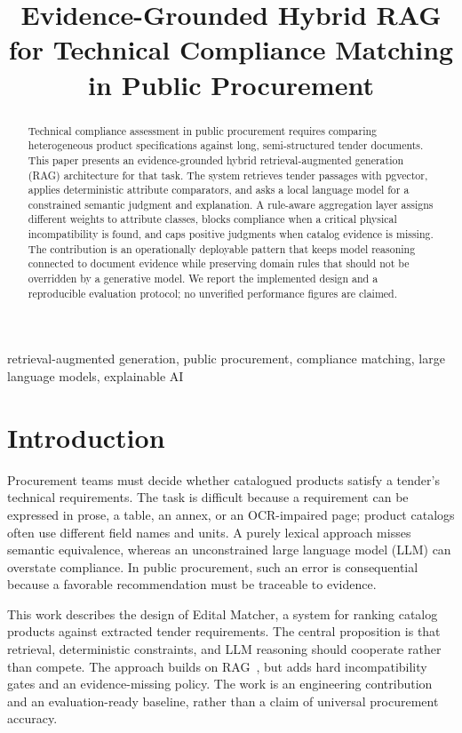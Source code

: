\documentclass[conference]{IEEEtran}
\title{Evidence-Grounded Hybrid RAG for Technical Compliance Matching in Public Procurement}
\author{\IEEEauthorblockN{Anonymous Author}
\IEEEauthorblockA{AI Engineering Practice\\
Replace with author name, affiliation, city, country, and email before submission}}
\begin{document}
\maketitle

\begin{abstract}
Technical compliance assessment in public procurement requires comparing heterogeneous product specifications against long, semi-structured tender documents. This paper presents an evidence-grounded hybrid retrieval-augmented generation (RAG) architecture for that task. The system retrieves tender passages with pgvector, applies deterministic attribute comparators, and asks a local language model for a constrained semantic judgment and explanation. A rule-aware aggregation layer assigns different weights to attribute classes, blocks compliance when a critical physical incompatibility is found, and caps positive judgments when catalog evidence is missing. The contribution is an operationally deployable pattern that keeps model reasoning connected to document evidence while preserving domain rules that should not be overridden by a generative model. We report the implemented design and a reproducible evaluation protocol; no unverified performance figures are claimed.
\end{abstract}

\begin{IEEEkeywords}
retrieval-augmented generation, public procurement, compliance matching, large language models, explainable AI
\end{IEEEkeywords}

\section{Introduction}
Procurement teams must decide whether catalogued products satisfy a tender's technical requirements. The task is difficult because a requirement can be expressed in prose, a table, an annex, or an OCR-impaired page; product catalogs often use different field names and units. A purely lexical approach misses semantic equivalence, whereas an unconstrained large language model (LLM) can overstate compliance. In public procurement, such an error is consequential because a favorable recommendation must be traceable to evidence.

This work describes the design of Edital Matcher, a system for ranking catalog products against extracted tender requirements. The central proposition is that retrieval, deterministic constraints, and LLM reasoning should cooperate rather than compete. The approach builds on RAG~\cite{lewis2020rag}, but adds hard incompatibility gates and an evidence-missing policy. The work is an engineering contribution and an evaluation-ready baseline, rather than a claim of universal procurement accuracy.
\end{document}
